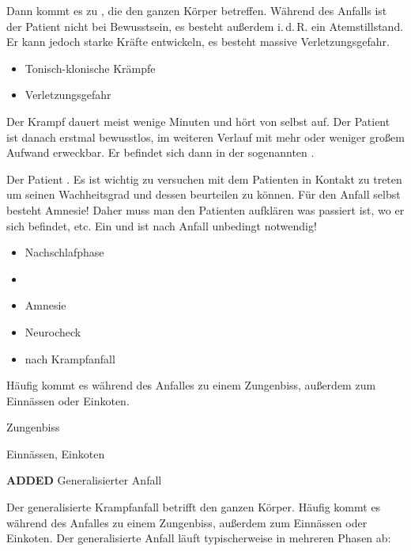 \documentclass[
ngerman,
paper=a4,
asymmetric,
fontsize=10pt,
headings=small,
draft=false,
numbers=noenddot,
bibtotocnumbered,
footnotes=multiple,
]{scrreprt}
\newcommand{\jALTende}{\newline{\color{red}\rule{\linewidth}{2pt}\newline}}
\newcommand{\jNEU}{{\color{green}\sffamily\textbf{ADDED}\hrulefill\newline\newline}}
\begin{document}
\begin{enumerate}
{}{}{}{}
 
{%
 Dann kommt es zu
 ,
 die den ganzen Körper betreffen. Während des Anfalls ist der
 Patient nicht bei Bewusstsein, es besteht außerdem i.\,d.\,R.
 ein Atemstillstand. Er kann jedoch starke Kräfte entwickeln, es
 besteht massive
 Verletzungsgefahr.
}{
\begin{itemize}
  \item Tonisch-klonische Krämpfe
  \item Verletzungsgefahr
\end{itemize}
}{}{}{}
 
{%
 Der Krampf dauert meist wenige Minuten und hört von selbst
 auf. Der Patient ist danach erstmal bewusstlos, im weiteren
 Verlauf mit mehr oder weniger großem Aufwand erweckbar. Er
 befindet sich dann in der sogenannten
 .

Der Patient . Es ist
 wichtig zu versuchen mit dem Patienten in Kontakt zu treten
 um seinen Wachheitsgrad und dessen
  beurteilen zu können. Für den Anfall selbst besteht
 Amnesie! Daher muss man den Patienten aufklären was passiert
 ist, wo er sich befindet, etc. Ein  und
  ist nach \underline{} Anfall
 unbedingt notwendig! 
}{
 \begin{itemize}
  \item Nachschlafphase
  \item {}
  \item Amnesie
  \item Neurocheck
  \item {} nach \underline{} Krampfanfall
\end{itemize}
}{}{}{}


{%
Häufig kommt es während des Anfalles zu einem Zungenbiss,
außerdem zum Einnässen oder Einkoten.
}{
\begin{compactitem}
   \item Zungenbiss
   \item Einnässen, Einkoten
\end{compactitem}
}{}{}{}


\jALTende

\jNEU
\TextSlide
{Generalisierter Anfall}
{%
Der generalisierte Krampfanfall  betrifft den ganzen Körper. Häufig kommt es während des Anfalles zu einem Zungenbiss,
außerdem zum Einnässen oder Einkoten. 
Der generalisierte Anfall läuft typischerweise in mehreren Phasen ab:
 
}
\end{enumerate}
\end{document}
